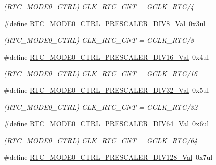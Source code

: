\begin{DoxyCompactItemize}
\begin{DoxyCompactList}\small\item\em (R\+T\+C\+\_\+\+M\+O\+D\+E0\+\_\+\+C\+T\+RL) C\+L\+K\+\_\+\+R\+T\+C\+\_\+\+C\+NT = G\+C\+L\+K\+\_\+\+R\+T\+C/4 \end{DoxyCompactList}\item 
\#define \mbox{\hyperlink{group___s_a_m_d21___r_t_c_ga3e6065672e5618bb55ed1e518a71577a}{R\+T\+C\+\_\+\+M\+O\+D\+E0\+\_\+\+C\+T\+R\+L\+\_\+\+P\+R\+E\+S\+C\+A\+L\+E\+R\+\_\+\+D\+I\+V8\+\_\+\+Val}}~0x3ul
\begin{DoxyCompactList}\small\item\em (R\+T\+C\+\_\+\+M\+O\+D\+E0\+\_\+\+C\+T\+RL) C\+L\+K\+\_\+\+R\+T\+C\+\_\+\+C\+NT = G\+C\+L\+K\+\_\+\+R\+T\+C/8 \end{DoxyCompactList}\item 
\#define \mbox{\hyperlink{group___s_a_m_d21___r_t_c_ga9f98053993e1fdd52f993797089d7ee9}{R\+T\+C\+\_\+\+M\+O\+D\+E0\+\_\+\+C\+T\+R\+L\+\_\+\+P\+R\+E\+S\+C\+A\+L\+E\+R\+\_\+\+D\+I\+V16\+\_\+\+Val}}~0x4ul
\begin{DoxyCompactList}\small\item\em (R\+T\+C\+\_\+\+M\+O\+D\+E0\+\_\+\+C\+T\+RL) C\+L\+K\+\_\+\+R\+T\+C\+\_\+\+C\+NT = G\+C\+L\+K\+\_\+\+R\+T\+C/16 \end{DoxyCompactList}\item 
\#define \mbox{\hyperlink{group___s_a_m_d21___r_t_c_gac81bb264f0a2d7bd0a6e2801f0cc3b98}{R\+T\+C\+\_\+\+M\+O\+D\+E0\+\_\+\+C\+T\+R\+L\+\_\+\+P\+R\+E\+S\+C\+A\+L\+E\+R\+\_\+\+D\+I\+V32\+\_\+\+Val}}~0x5ul
\begin{DoxyCompactList}\small\item\em (R\+T\+C\+\_\+\+M\+O\+D\+E0\+\_\+\+C\+T\+RL) C\+L\+K\+\_\+\+R\+T\+C\+\_\+\+C\+NT = G\+C\+L\+K\+\_\+\+R\+T\+C/32 \end{DoxyCompactList}\item 
\#define \mbox{\hyperlink{group___s_a_m_d21___r_t_c_gac0fc48bdfa32e15f293b0d6b2969b210}{R\+T\+C\+\_\+\+M\+O\+D\+E0\+\_\+\+C\+T\+R\+L\+\_\+\+P\+R\+E\+S\+C\+A\+L\+E\+R\+\_\+\+D\+I\+V64\+\_\+\+Val}}~0x6ul
\begin{DoxyCompactList}\small\item\em (R\+T\+C\+\_\+\+M\+O\+D\+E0\+\_\+\+C\+T\+RL) C\+L\+K\+\_\+\+R\+T\+C\+\_\+\+C\+NT = G\+C\+L\+K\+\_\+\+R\+T\+C/64 \end{DoxyCompactList}\item 
\#define \mbox{\hyperlink{group___s_a_m_d21___r_t_c_ga4b76c03124a7a219022997a2bbfb21cf}{R\+T\+C\+\_\+\+M\+O\+D\+E0\+\_\+\+C\+T\+R\+L\+\_\+\+P\+R\+E\+S\+C\+A\+L\+E\+R\+\_\+\+D\+I\+V128\+\_\+\+Val}}~0x7ul

\end{DoxyCompactItemize}
